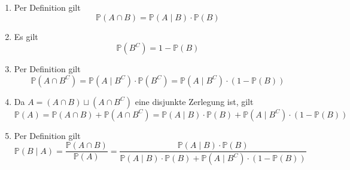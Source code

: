 \documentclass{article}
\begin{document}
\begin{solution}
\begin{enumerate}
\item {
Per Definition gilt
\[
\mathbb{P}(A \cap B) = \mathbb{P}(A \mid B) \cdot \mathbb{P}(B)
\]
}
\item {
Es gilt
\[
\mathbb{P}(B^C) = 1 - \mathbb{P}(B)
\]
}
\item {
Per Definition gilt
\[
\mathbb{P}(A \cap B^C) = \mathbb{P}(A \mid B^C) \cdot \mathbb{P}(B^C) = \mathbb{P}(A \mid B^C) \cdot (1 - \mathbb{P}(B))
\]
}
\item {
Da $A = (A \cap B) \sqcup (A \cap B^C)$ eine disjunkte Zerlegung ist, gilt
\[
\mathbb{P}(A) = \mathbb{P}(A \cap B) + \mathbb{P}(A \cap B^C) = \mathbb{P}(A \mid B) \cdot \mathbb{P}(B) + \mathbb{P}(A \mid B^C) \cdot (1 - \mathbb{P}(B))
\]
}
\item {
Per Definition gilt
\[
\mathbb{P}(B \mid A) = \frac{\mathbb{P}(A \cap B)}{\mathbb{P}(A)} = \frac{\mathbb{P}(A \mid B) \cdot \mathbb{P}(B)}{\mathbb{P}(A \mid B) \cdot \mathbb{P}(B) + \mathbb{P}(A \mid B^C) \cdot (1 - \mathbb{P}(B))}
\]
}
\end{enumerate}
\end{solution}
\end{document}
